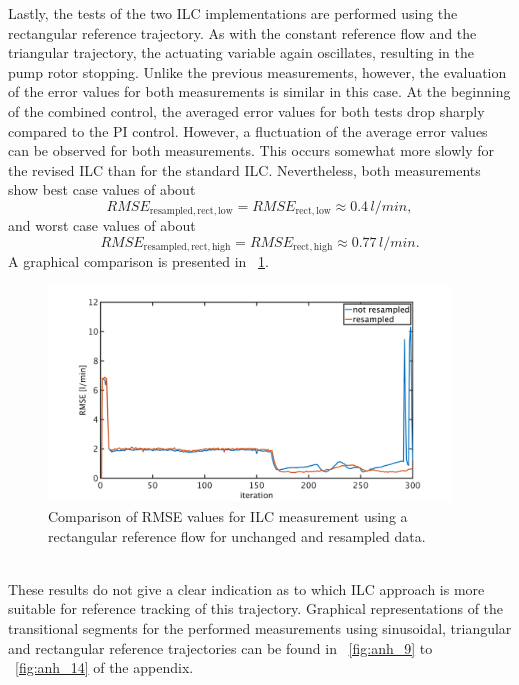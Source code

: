 \newpage
Lastly, the tests of the two ILC implementations are performed using the rectangular reference trajectory.  As with the constant reference flow and the triangular trajectory, the actuating variable again oscillates, resulting in the pump rotor stopping.
Unlike the previous measurements, however, the evaluation of the error values for both measurements is similar in this case. At the beginning of the combined control, the averaged error values for both tests drop sharply compared to the PI control. However, a fluctuation of the average error values can be observed for both measurements. This occurs somewhat more slowly for the revised ILC than for the standard ILC. Nevertheless, both measurements show best case values of about
\begin{equation}
  RMSE_{\mathrm{resampled,rect,low}}=RMSE_{\mathrm{rect,low}}\approx0.4\,l/min,
\end{equation}
and worst case values of about
\begin{equation}
  RMSE_{\mathrm{resampled,rect,high}}=RMSE_{\mathrm{rect,high}}\approx0.77\,l/min.
\end{equation}
A graphical comparison is presented in \figurename~\ref{fig:RMSE_ilc_var_dist_comp_rect}.
\begin{figure}[ht!]
  \centering
  \includegraphics[width=0.95\textwidth]{images/chapt_5/ILC/RMSE_ilc_var_dist_comp_rect.pdf}
  \caption[Comparison of RMSE values for ILC measurement using a rectangular reference flow for unchanged and resampled data]{Comparison of RMSE values for ILC measurement using a rectangular reference flow for unchanged and resampled data.}
  \label{fig:RMSE_ilc_var_dist_comp_rect}
\end{figure}
\\These results do not give a clear indication as to which ILC approach is more suitable for reference tracking of this trajectory.
\newpage
Graphical representations of the transitional segments for the performed measurements using sinusoidal, triangular and rectangular reference trajectories can be found in \figurename~\ref{fig:anh_9} to \figurename~\ref{fig:anh_14} of the appendix.


